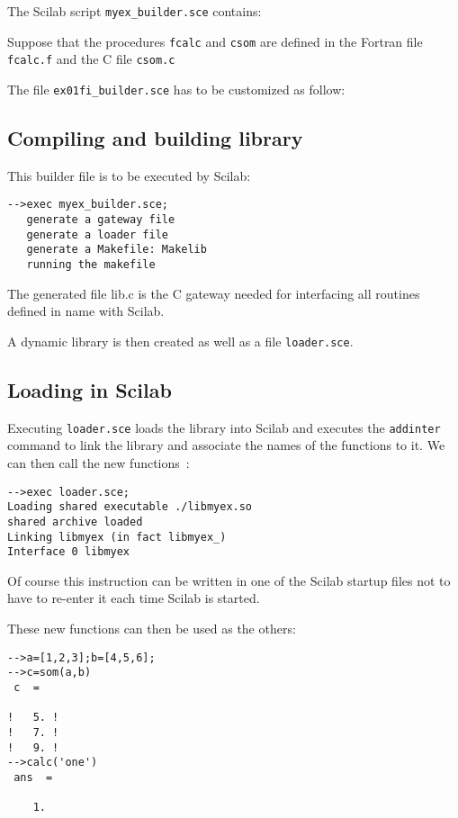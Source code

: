 \documentclass[11pt]{article}
\begin{document}
\noindent The Scilab script \verb!myex_builder.sce! contains:



\noindent Suppose that the procedures {\tt fcalc} and {\tt csom} are defined in
the Fortran file {\tt fcalc.f}
and the C file {\tt csom.c}

\noindent The file \verb!ex01fi_builder.sce! has to be customized as follow:


\subsection{Compiling and building library}
This  builder file is to be executed 
by Scilab:

\begin{verbatim}
-->exec myex_builder.sce;
   generate a gateway file
   generate a loader file
   generate a Makefile: Makelib
   running the makefile
\end{verbatim}

The generated file lib.c is the C gateway needed for interfacing all routines defined
in  name with Scilab. 

A dynamic library is then created as well as a file \verb!loader.sce!. 

\subsection{Loading in Scilab}
Executing \verb!loader.sce! loads the library into Scilab and executes the
\verb!addinter! command to link the library and associate the names
of the functions  to it. We can then call the new functions~:
\begin{verbatim}
-->exec loader.sce;
Loading shared executable ./libmyex.so
shared archive loaded
Linking libmyex (in fact libmyex_)
Interface 0 libmyex
\end{verbatim}
Of course this instruction can be written in one of the Scilab startup
files not to have to re-enter it each time Scilab is started.
\medskip

These new functions can then be used as the others:

\begin{verbatim}
-->a=[1,2,3];b=[4,5,6]; 
-->c=som(a,b)
 c  =
 
!   5. !
!   7. !
!   9. !
-->calc('one')
 ans  =
 
    1.  
\end{verbatim}
\end{document}

